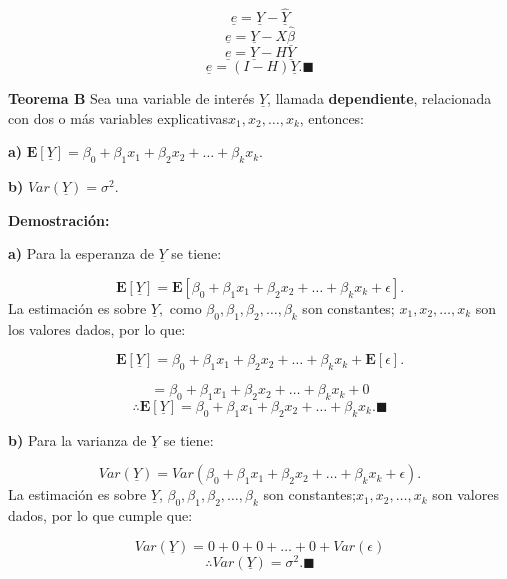 \documentclass[
  a4paper,
  oneside,
  openany]{book}
\begin{document}
\[\underline{e}=\underline{Y}-\underline{\hat{Y}}\]
\[\underline{e}=\underline{Y}-X\underline{\hat{\beta}}\]
\[\underline{e}=\underline{Y}-H\underline{Y}\]
\[\underline{e}=(I-H)\underline{Y}.\blacksquare\]

\textbf{Teorema B} Sea una variable de interés \(\underline{Y}\), llamada \textbf{dependiente}, relacionada con dos o más variables explicativas\(x_{1},x_{2},\ldots,x_{k}\),
entonces:

\textbf{a)} \(\mathbf{E}[\underline{Y}]= \beta_{0}+\beta_{1}x_{1}+\beta_{2}x_{2}+ \ldots + \beta_{k}x_{k}.\)

\textbf{b)} \(Var(\underline{Y})= \sigma^2.\)

\textbf{Demostración:}

\textbf{a)} Para la esperanza de \(\underline{Y}\) se tiene:

\[\mathbf{E}[\underline{Y}]=\mathbf{E}[\beta_{0}+\beta_{1}x_{1}+\beta_{2}x_{2}+ \ldots +\beta_{k}x_{k}+\epsilon].\]
La estimación es sobre \(\underline{Y},\)
como \(\beta_{0},\beta_{1},\beta_{2},\ldots,\beta_{k}\) son constantes; \(x_{1},x_{2}, \ldots,x_{k}\) son los valores dados, por lo que:

\[\mathbf{E}[\underline{Y}]=\beta_{0}+\beta_{1}x_{1}+\beta_{2}x_{2}+ \ldots +\beta_{k}x_{k}+\mathbf{E}[\epsilon].\]

\[=\beta_{0}+\beta_{1}x_{1}+\beta_{2}x_{2}+ \ldots +\beta_{k}x_{k}+0\]
\[\therefore \mathbf{E}[\underline{Y}]= \beta_{0}+\beta_{1}x_{1}+\beta_{2}x_{2}+ \ldots + \beta_{k}x_{k}. \blacksquare\]

\textbf{b)} Para la varianza de \(\underline{Y}\) se tiene:

\[Var(\underline{Y})=Var\left( \beta_{0}+\beta_{1}x_{1}+\beta_{2}x_{2}+ \ldots + \beta_{k}x_{k}+ \epsilon\right).\]
La estimación es sobre \(\underline{Y}\), \(\beta_{0},\beta_{1},\beta_{2},\ldots,\beta_{k}\) son constantes;\(x_{1},x_{2},\ldots,x_{k}\) son valores dados, por lo que cumple que:

\[Var(\underline{Y})=0+0+0+\ldots+0+Var(\epsilon)\]
\[\therefore Var(\underline{Y})=\sigma^2.\blacksquare\]

  
\end{document}
